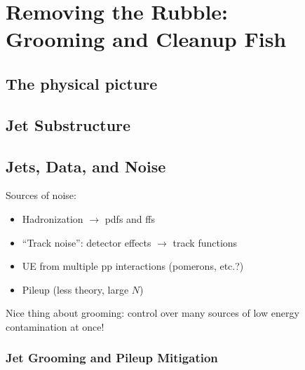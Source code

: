 \chapter[Removing the Rubble: Grooming and Cleanup Fish]{Removing the Rubble:\\Grooming and Cleanup Fish}

\section{The physical picture}



\section{Jet Substructure}

\section{Jets, Data, and Noise}

Sources of noise:

\begin{itemize}
    \item
        Hadronization \(\to\) pdfs and ffs
    \item
        ``Track noise'': detector effects \(\to\) track functions

    \item
        UE from multiple pp interactions (pomerons, etc.?)
    \item
        Pileup (less theory, large \(N\))
\end{itemize}

Nice thing about grooming: control over many sources of low energy contamination at once!

\subsection{Jet Grooming and Pileup Mitigation}




